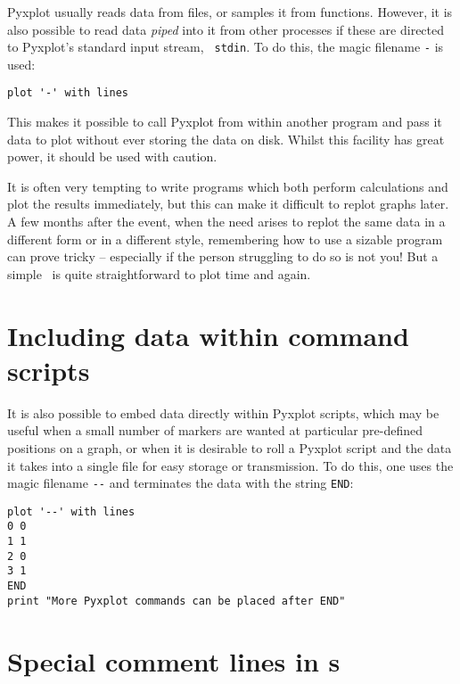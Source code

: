 Pyxplot usually reads data from files, or samples it from functions. However,
it is also possible to read data {\it piped} into it from other
processes if these are directed to Pyxplot's standard input stream, {\tt
stdin}.  To do this, the magic filename {\tt -} is used:

\begin{verbatim}
plot '-' with lines
\end{verbatim}

This makes it possible to call Pyxplot from within another program and pass it
data to plot without ever storing the data on disk. Whilst this facility has
great power, it should be used with caution.

It is often very tempting to write programs which both perform calculations and
plot the results immediately, but this can make it difficult to replot graphs
later. A few months after the event, when the need arises to replot the same
data in a different form or in a different style, remembering how to use a
sizable program can prove tricky -- especially if the person struggling to do
so is not you! But a simple \datafile\ is quite straightforward to plot time
and again.

\section{Including data within command scripts}

It is also possible to embed data directly within Pyxplot scripts, which may be
useful when a small number of markers are wanted at particular pre-defined
positions on a graph, or when it is desirable to roll a Pyxplot script and the
data it takes into a single file for easy storage or transmission. To do this,
one uses the magic filename {\tt \--\--} and terminates the data with the string
{\tt END}:

\begin{verbatim}
plot '--' with lines
0 0
1 1
2 0
3 1
END
print "More Pyxplot commands can be placed after END"
\end{verbatim}

\section{Special comment lines in \datafile s}
\label{sec:special_comments}

